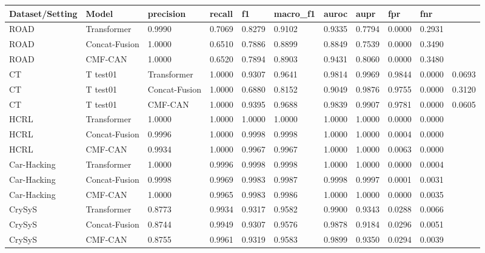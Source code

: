 \begin{tabular}{llllllllll}
\toprule
Dataset/Setting & Model & precision & recall & f1 & macro_f1 & auroc & aupr & fpr & fnr \\
\midrule
ROAD & Transformer & 0.9990 & 0.7069 & 0.8279 & 0.9102 & 0.9335 & 0.7794 & 0.0000 & 0.2931 \\
ROAD & Concat-Fusion & 1.0000 & 0.6510 & 0.7886 & 0.8899 & 0.8849 & 0.7539 & 0.0000 & 0.3490 \\
ROAD & CMF-CAN & 1.0000 & 0.6520 & 0.7894 & 0.8903 & 0.9431 & 0.8060 & 0.0000 & 0.3480 \\
CT&T test01 & Transformer & 1.0000 & 0.9307 & 0.9641 & 0.9814 & 0.9969 & 0.9844 & 0.0000 & 0.0693 \\
CT&T test01 & Concat-Fusion & 1.0000 & 0.6880 & 0.8152 & 0.9049 & 0.9876 & 0.9755 & 0.0000 & 0.3120 \\
CT&T test01 & CMF-CAN & 1.0000 & 0.9395 & 0.9688 & 0.9839 & 0.9907 & 0.9781 & 0.0000 & 0.0605 \\
HCRL & Transformer & 1.0000 & 1.0000 & 1.0000 & 1.0000 & 1.0000 & 1.0000 & 0.0000 & 0.0000 \\
HCRL & Concat-Fusion & 0.9996 & 1.0000 & 0.9998 & 0.9998 & 1.0000 & 1.0000 & 0.0004 & 0.0000 \\
HCRL & CMF-CAN & 0.9934 & 1.0000 & 0.9967 & 0.9967 & 1.0000 & 1.0000 & 0.0063 & 0.0000 \\
Car-Hacking & Transformer & 1.0000 & 0.9996 & 0.9998 & 0.9998 & 1.0000 & 1.0000 & 0.0000 & 0.0004 \\
Car-Hacking & Concat-Fusion & 0.9998 & 0.9969 & 0.9983 & 0.9987 & 0.9998 & 0.9997 & 0.0001 & 0.0031 \\
Car-Hacking & CMF-CAN & 1.0000 & 0.9965 & 0.9983 & 0.9986 & 1.0000 & 1.0000 & 0.0000 & 0.0035 \\
CrySyS & Transformer & 0.8773 & 0.9934 & 0.9317 & 0.9582 & 0.9900 & 0.9343 & 0.0288 & 0.0066 \\
CrySyS & Concat-Fusion & 0.8744 & 0.9949 & 0.9307 & 0.9576 & 0.9878 & 0.9184 & 0.0296 & 0.0051 \\
CrySyS & CMF-CAN & 0.8755 & 0.9961 & 0.9319 & 0.9583 & 0.9899 & 0.9350 & 0.0294 & 0.0039 \\
\bottomrule
\end{tabular}
